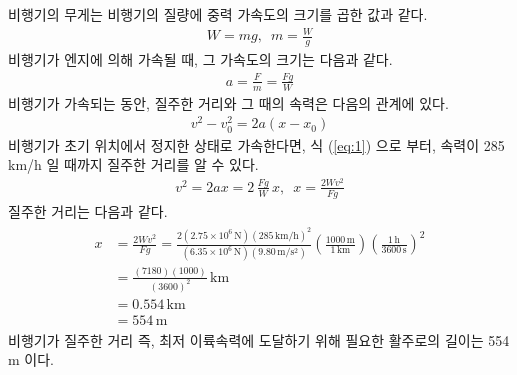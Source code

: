 \documentclass[floatfix,nofootinbib,superscriptaddress,fleqn,preprint]{revtex4}
\begin{document}
 비행기의 무게는 비행기의 질량에 중력 가속도의 크기를
곱한 값과 같다.
\begin{align}
  W=mg,\,\,\,m=\frac{W}{g}
\end{align}
비행기가 엔지에 의해 가속될 때, 그 가속도의 크기는 다음과 같다.
\begin{align}
  a=\frac{F}{m}=\frac{Fg}{W}
\end{align}
비행기가 가속되는 동안, 질주한 거리와 그 때의 속력은 
다음의 관계에 있다.
\begin{align}\label{eq:1}
 v^2-v^2_0 = 2a(x-x_0) 
\end{align}
비행기가 초기 위치에서 정지한 상태로 가속한다면, 식 (\ref{eq:1}) 으로
부터, 속력이 285 km/h 일 때까지 질주한 거리를 알 수 있다.
\begin{align}
    v^2 = 2ax = 2\,\frac{Fg}{W}\,x,\,\,\,
    x=\frac{2Wv^2}{Fg}
\end{align}
질주한 거리는 다음과 같다.
\begin{align}
  \begin{split}
    x&=\frac{2Wv^2}{Fg}
    =\frac{2(2.75\times 10^6\,\mathrm{N}){(285\,\mathrm{km/h})}^2}
    {(6.35\times 10^6\,\mathrm{N})(9.80\,\mathrm{m/s^2})}
    \left(\frac{1000\,\mathrm{m}}{1\,\mathrm{km}}\right)
    \left(\frac{1\,\mathrm{h}}{3600\,\mathrm{s}}\right)^2 \\
    &=\frac{(7180)(1000)}{(3600)^2}\,\mathrm{km}  \\
    &=0.554\,\mathrm{km} \\
    &= 554\,\mathrm{m}
  \end{split}
\end{align}
비행기가 질주한 거리 즉, 최저 이륙속력에 도달하기 위해 필요한 
활주로의 길이는 554 m 이다.

\vspace{2cm}
\end{document}

